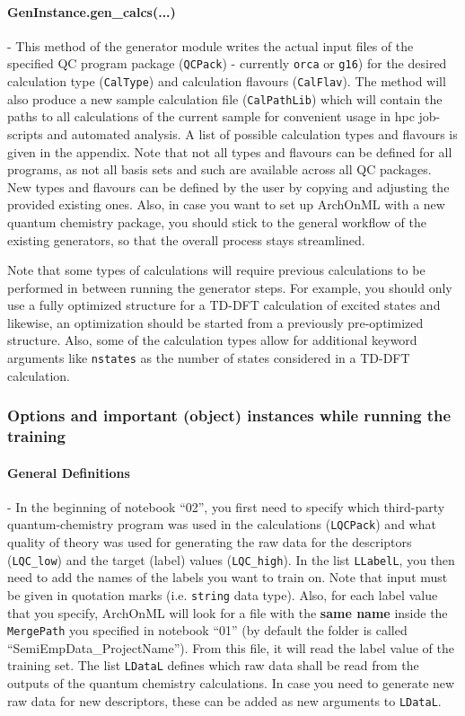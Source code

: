 \documentclass[12pt]{achemso}
\begin{document}
\paragraph{GenInstance.gen\_calcs(...)} - This method of the generator module writes the actual input files of the specified QC program package (\texttt{QCPack}) - currently \texttt{orca} or \texttt{g16}) for the desired calculation type (\texttt{CalType}) and calculation flavours (\texttt{CalFlav}). The method will also produce a new sample calculation file (\texttt{CalPathLib}) which will contain the paths to all calculations of the current sample for convenient usage in hpc job-scripts and automated analysis. A list of possible calculation types and flavours is given in the appendix. Note that not all types and flavours can be defined for all programs, as not all basis sets and such are available across all QC packages. New types and flavours can be defined by the user by copying and adjusting the provided existing ones. Also, in case you want to set up ArchOnML with a new quantum chemistry package, you should stick to the general workflow of the existing generators, so that the overall process stays streamlined.

\noindent Note that some types of calculations will require previous calculations to be performed in between running the generator steps. For example, you should only use a fully optimized structure for a TD-DFT calculation of excited states and likewise, an optimization should be started from a previously pre-optimized structure. Also, some of the calculation types allow for additional keyword arguments like \texttt{nstates} as the number of states considered in a TD-DFT calculation.

\subsubsection{Options and important (object) instances while running the training}

\paragraph{General Definitions} - In the beginning of notebook ``02'', you first need to specify which third-party quantum-chemistry program was used in the calculations (\texttt{LQCPack}) and what quality of theory was used for generating the raw data for the descriptors (\texttt{LQC\_low}) and the target (label) values (\texttt{LQC\_high}). In the list \texttt{LLabelL}, you then need to add the names of the labels you want to train on. Note that input must be given in quotation marks (i.e. \texttt{string} data type). Also, for each label value that you specify, ArchOnML will look for a file with the \textbf{same name} inside the \texttt{MergePath} you specified in notebook ``01'' (by default the folder is called ``SemiEmpData\_ProjectName''). From this file, it will read the label value of the training set. The list \texttt{LDataL} defines which raw data shall be read from the outputs of the quantum chemistry calculations. In case you need to generate new raw data for new descriptors, these can be added as new arguments to \texttt{LDataL}.
\end{document}
